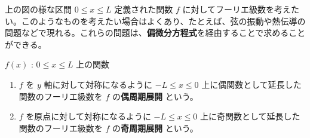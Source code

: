 \documentclass[article,paper=a4paper]{jlreq}
\begin{document}
\vspace{1\baselineskip}
上の図の様な区間 $0 \leq x \leq L$ 定義された関数 $f$ に対してフーリエ級数を考えたい。このようなものを考えたい場合はよくあり、たとえば、弦の振動や熱伝導の問題などで現れる。これらの問題は、\textbf{偏微分方程式}を経由することで求めることができる。

\begin{dfn}
    $f(x)$ : $0 \leq x \leq L$ 上の関数\par
    \begin{enumerate}[label=(\arabic*)\,]
        \item $f$ を $y$ 軸に対して対称になるように $-L \leq x \leq 0$ 上に偶関数として延長した関数のフーリエ級数を $f$ の\textbf{偶周期展開} という。
        \item $f$ を原点に対して対称になるように $-L \leq x \leq 0$ 上に奇関数として延長した関数のフーリエ級数を $f$ の\textbf{奇周期展開} という。
    \end{enumerate}
\end{dfn}
\end{document}
